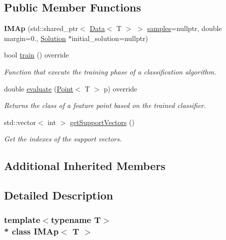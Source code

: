 \subsection*{Public Member Functions}
\begin{DoxyCompactItemize}
\item 
{\bfseries I\+M\+Ap} (std\+::shared\+\_\+ptr$<$ \hyperlink{class_data}{Data}$<$ T $>$ $>$ \hyperlink{class_classifier_a0000b47a2e0784ada4c52d7046c4adb8}{samples}=nullptr, double margin=0., \hyperlink{class_solution}{Solution} $\ast$initial\+\_\+solution=nullptr)\hypertarget{class_i_m_ap_a54d31e0bcbb062d224a40fdb3a9fcdcd}{}\label{class_i_m_ap_a54d31e0bcbb062d224a40fdb3a9fcdcd}

\item 
bool \hyperlink{class_i_m_ap_aa8bf6b0d21a76d388fe81ee516b627e4}{train} () override
\begin{DoxyCompactList}\small\item\em Function that execute the training phase of a classification algorithm. \end{DoxyCompactList}\item 
double \hyperlink{class_i_m_ap_a41b0739cdc486e3f21e7927f1ad429a8}{evaluate} (\hyperlink{class_point}{Point}$<$ T $>$ p) override
\begin{DoxyCompactList}\small\item\em Returns the class of a feature point based on the trained classifier. \end{DoxyCompactList}\item 
std\+::vector$<$ int $>$ \hyperlink{class_i_m_ap_a87adda768f1c48c0e4fcdf66f3145ae9}{get\+Support\+Vectors} ()
\begin{DoxyCompactList}\small\item\em Get the indexes of the support vectors. \end{DoxyCompactList}\end{DoxyCompactItemize}
\subsection*{Additional Inherited Members}


\subsection{Detailed Description}
\subsubsection*{template$<$typename T$>$\\*
class I\+M\+Ap$<$ T $>$}

